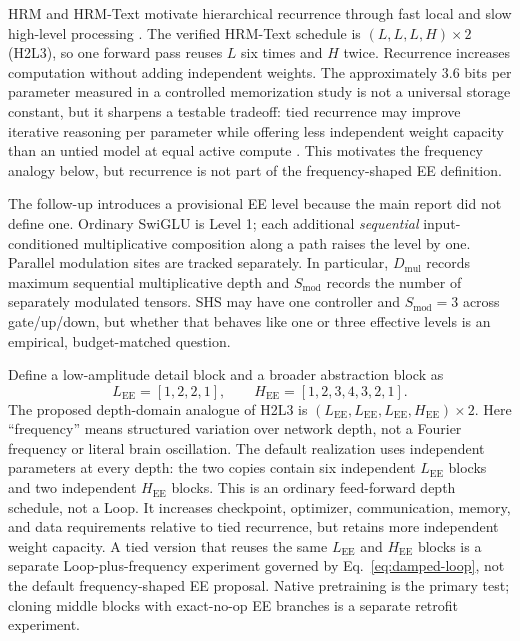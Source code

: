 \documentclass[10pt]{article}
\begin{document}
HRM and HRM-Text motivate hierarchical recurrence through fast local and slow
high-level processing \citep{wang2025hrm,wang2026hrmtext}.  The verified
HRM-Text schedule is $(L,L,L,H)\times2$ (H2L3), so one forward pass reuses $L$
six times and $H$ twice.  Recurrence increases computation without adding
independent weights.  The approximately 3.6 bits per parameter measured in a
controlled memorization study is not a universal storage constant, but it
sharpens a testable tradeoff: tied recurrence may improve iterative reasoning
per parameter while offering less independent weight capacity than an untied
model at equal active compute \citep{morris2025memorize}.  This motivates the
frequency analogy below, but recurrence is not part of the frequency-shaped EE
definition.

The follow-up introduces a provisional EE level because the main report did
not define one.  Ordinary SwiGLU is Level 1; each additional \emph{sequential}
input-conditioned multiplicative composition along a path raises the level by
one.  Parallel modulation sites are tracked separately.  In particular,
$D_{\mathrm{mul}}$ records maximum sequential multiplicative depth and
$S_{\mathrm{mod}}$ records the number of separately modulated tensors.  SHS
may have one controller and $S_{\mathrm{mod}}=3$ across gate/up/down, but
whether that behaves like one or three effective levels is an empirical,
budget-matched question.

Define a low-amplitude detail block and a broader abstraction block as
\begin{equation}
 L_{\mathrm{EE}}=[1,2,2,1],
 \qquad
 H_{\mathrm{EE}}=[1,2,3,4,3,2,1].
\end{equation}
The proposed depth-domain analogue of H2L3 is
$(L_{\mathrm{EE}},L_{\mathrm{EE}},L_{\mathrm{EE}},H_{\mathrm{EE}})\times2$.
Here ``frequency'' means structured variation over network depth, not a
Fourier frequency or literal brain oscillation.  The default realization uses
independent parameters at every depth: the two copies contain six independent
$L_{\mathrm{EE}}$ blocks and two independent $H_{\mathrm{EE}}$ blocks.  This is
an ordinary feed-forward depth schedule, not a Loop.  It increases checkpoint,
optimizer, communication, memory, and data requirements relative to tied
recurrence, but retains more independent weight capacity.  A tied version that
reuses the same $L_{\mathrm{EE}}$ and $H_{\mathrm{EE}}$ blocks is a separate
Loop-plus-frequency experiment governed by Eq.~\ref{eq:damped-loop}, not the
default frequency-shaped EE proposal.  Native pretraining is the primary test;
cloning middle blocks with exact-no-op EE branches is a separate retrofit
experiment.
\end{document}
